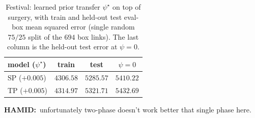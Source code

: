 \documentclass[sigconf, review]{acmart}
\newcommand{\hamid}[1]{{\color{blue}\textbf{HAMID:}\ #1}}
\begin{document}
\begin{table}[t]
\centering
\caption{Festival: learned prior transfer $\psi^\star$ on top of surgery,
with train and held-out test eval-box mean squared error (single random $75/25$ split of the $694$ box links). The last
column is the held-out test error at $\psi=0$.}
\label{tab:festival-psi}
\setlength{\tabcolsep}{8pt}
\begin{tabular}{lccc}
\toprule
model ($\psi^\star$) & train & test & $\psi{=}0$ \\
\midrule
SP ($+0.005$) & $4306.58$ & $5285.57$ & $5410.22$ \\
TP ($+0.005$) & $4314.97$ & $5321.71$ & $5432.69$ \\
\bottomrule
\end{tabular}
\end{table}

\hamid{unfortunately two-phase doesn't work better that single phase here.}



\end{document}
